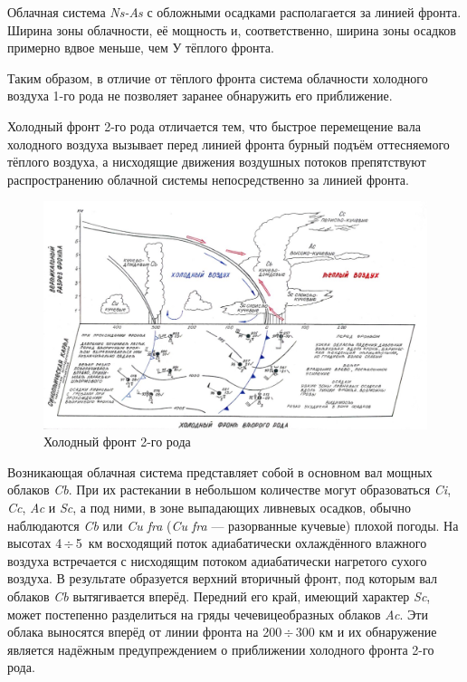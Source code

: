 \documentclass[a4paper, 12pt, twoside, draft, book, russian, fittopage, cyremdash, openright]{ncc}
\newcommand{\otdo}{\,\ensuremath{\div}\,}
\begin{document}
Облачная система \textit{Ns-As} с обложными осадками располагается за
линией фронта. Ширина зоны облачности, её мощность и, соответственно,
ширина зоны осадков примерно вдвое меньше, чем У тёплого фронта.

Таким образом, в отличие от тёплого фронта система облачности
холодного воздуха 1-го рода не позволяет заранее обнаружить его
приближение.

Холодный фронт 2-го рода отличается тем, что быстрое перемещение вала
холодного воздуха вызывает перед линией фронта бурный подъём
оттесняемого тёплого воздуха, а нисходящие движения воздушных потоков
препятствуют распространению облачной системы непосредственно за
линией фронта.

\begin{figure}[htb]
   \centering
   \includegraphics[scale=0.7]{08_cold_front_2.pdf}
   \caption{Холодный фронт 2-го рода}
   \label{fig:08_cold_front_2}
\end{figure}

Возникающая облачная система представляет собой в основном вал мощных
облаков \textit{Cb}. При их растекании в небольшом количестве могут
образоваться \textit{Ci}, \textit{Cc}, \textit{Ac} и \textit{Sc}, а
под ними, в зоне выпадающих ливневых осадков, обычно наблюдаются
\textit{Cb} или \textit{Cu fra} (\textit{Cu fra} — разорванные
кучевые) плохой погоды.  На высотах 4\otdo5~км восходящий поток
адиабатически охлаждённого влажного воздуха встречается с нисходящим
потоком адиабатически нагретого сухого воздуха. В результате
образуется верхний вторичный фронт, под которым вал облаков
\textit{Cb} вытягивается вперёд. Передний его край, имеющий характер
\textit{Sc}, может постепенно разделиться на гряды чечевицеобразных
облаков \textit{Ac}. Эти облака выносятся вперёд от линии фронта на
200\otdo300 км и их обнаружение является надёжным предупреждением о
приближении холодного фронта 2-го рода.
\end{document}
